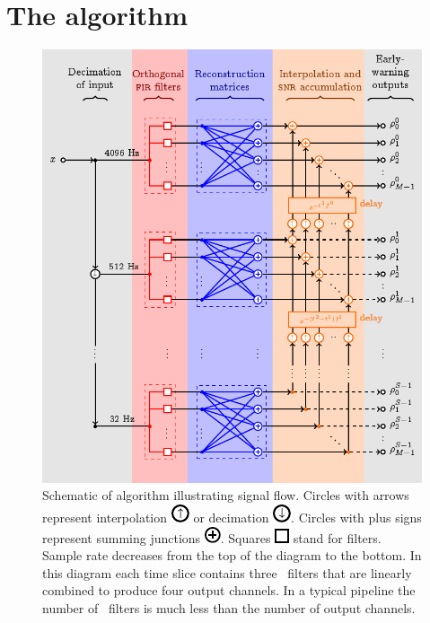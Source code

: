 \documentclass[portrait,plainboxedsections]{sciposter}
\begin{document}
\begin{minipage}[t]{0.4\textwidth}

\section*{The \lloid{} algorithm}

\begin{figure}[h!]
	\begin{center}
		\includegraphics[width=\textwidth]{figures/lloid-diagram}
		\caption{\label{fig:pipeline} Schematic of \lloid{} algorithm illustrating
signal flow.  Circles with arrows represent interpolation
\protect\includegraphics[scale=3]{figures/upsample-symbol} or decimation
\protect\includegraphics[scale=3]{figures/downsample-symbol}.  Circles with plus
signs represent summing junctions
\protect\includegraphics[scale=3]{figures/adder-symbol}.  Squares
\protect\includegraphics[scale=3]{figures/fir-symbol} stand for \fir{} filters.  Sample
rate decreases from the top of the diagram to the bottom.  In this diagram each
time slice contains three \fir\ filters that are linearly combined to produce
four output channels.  In a typical pipeline the number of \fir\ filters is
much less than the number of output channels.}
	\end{center}
\end{figure}


\end{minipage}
\end{document}
